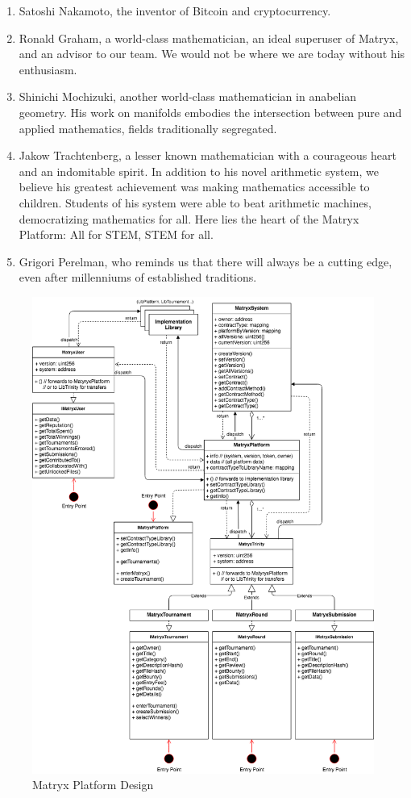 \documentclass[a4paper, 10pt, conference]{ieeeconf}      %
\begin{document}
\begin{enumerate}
\item Satoshi Nakamoto, the inventor of Bitcoin and cryptocurrency.
\item Ronald Graham, a world-class mathematician, an ideal superuser of Matryx, and an advisor to our team. We would not be where we are today without his enthusiasm.
\item Shinichi Mochizuki, another world-class mathematician in anabelian geometry. His work on manifolds embodies the intersection between pure and applied mathematics, fields traditionally segregated.
\item Jakow Trachtenberg, a lesser known mathematician with a courageous heart and an indomitable spirit. 
In addition to his novel arithmetic system, we believe his greatest achievement was making mathematics accessible to children.
Students of his system were able to beat arithmetic machines, democratizing mathematics for all.
Here lies the heart of the Matryx Platform: All for STEM, STEM for all.
\item Grigori Perelman, who reminds us that there will always be a cutting edge, even after millenniums of established traditions.
\end{enumerate}

\fi

\printbibliography

\begin{figure}
\caption{Matryx Platform Design}
\label{Platformdesign}
\centering
\includegraphics[scale = .5]{../Figures/architecture.png}
\end{figure}
\end{document}
